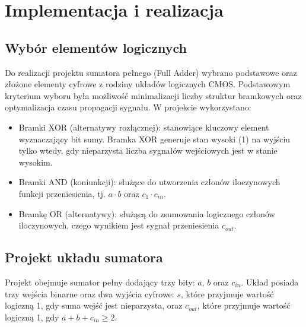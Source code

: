 %   

\section{Implementacja i realizacja}

\subsection{Wybór elementów logicznych}

Do realizacji projektu sumatora pełnego (Full Adder) wybrano podstawowe oraz złożone elementy cyfrowe z rodziny układów logicznych CMOS. Podstawowym kryterium wyboru była możliwość minimalizacji liczby struktur bramkowych oraz optymalizacja czasu propagacji sygnału. W projekcie wykorzystano:

\begin{itemize}
    \item Bramki XOR (alternatywy rozłącznej): stanowiące kluczowy element wyznaczający bit sumy. Bramka XOR generuje stan wysoki (1) na wyjściu tylko wtedy, gdy nieparzysta liczba sygnałów wejściowych jest w stanie wysokim.
    \item Bramki AND (koniunkcji): służące do utworzenia członów iloczynowych funkcji przeniesienia, tj. $a \cdot b$ oraz $c_1 \cdot c_{in}$.
    \item Bramkę OR (alternatywy): służącą do zsumowania logicznego członów iloczynowych, czego wynikiem jest sygnał przeniesienia $c_{out}$.
\end{itemize}

\subsection{Projekt układu sumatora}

Projekt obejmuje sumator pełny dodający trzy bity: $a$, $b$ oraz $c_{in}$. Układ posiada trzy wejścia binarne oraz dwa wyjścia cyfrowe: $s$, które przyjmuje wartość logiczną 1, gdy suma wejść jest nieparzysta, oraz $c_{out}$, które przyjmuje wartość logiczną 1, gdy $a + b + c_{in} \geq 2$.

